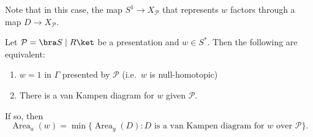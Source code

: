 \documentclass[a4paper]{article}
\DeclareMathOperator\Area{Area}
\begin{document}
Note that in this case, the map $S^1 \to X_{\mathcal{P}}$ that represents $w$ factors through a map $D \to X_\mathcal{P}$.

\begin{lemma}
  Let $\mathcal{P} = \bra S \mid R\ket$ be a presentation and $w \in S^*$. Then the following are equivalent:
  \begin{enumerate}
    \item $w = 1$ in $\Gamma$ presented by $\mathcal{P}$ (i.e.\ $w$ is null-homotopic)
    \item There is a van Kampen diagram for $w$ given $\mathcal{P}$.
  \end{enumerate}
  If so, then
  \[
    \Area_a(w) = \min \{\Area_g(D): D\text{ is a van Kampen diagram for $w$ over $\mathcal{P}$}\}.
  \]
\end{lemma}
\end{document}

